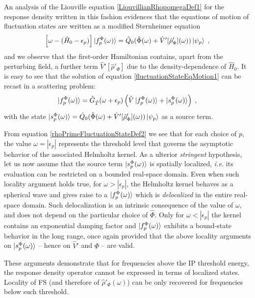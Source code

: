 \documentclass[reprint,aps,prb]{revtex4-1}
\newcommand{\eps}{\epsilon}
\newcommand{\be}{\begin{equation}}
\newcommand{\ee}{\end{equation}}
\newcommand{\lb}{\label}
\newcommand{\op}[1]{\hat {#1}}
\newcommand{\dm}{\op{\rho}}
\newcommand{\hnot}{\op{H}_0}
\newcommand{\GH}{\op G_{\op T}}
\begin{document}
An analysis of the Liouville equation \eqref{LiouvillianRhopomegaDef1} for the response density written in this fashion evidences that the equations of motion of fluctuation states  are
written as a modified Sternheimer equation~\cite{mahan1980,giustino2012,giustino2014}
\be\lb{fluctuationStateEqMotion1}
\left[\omega - (\hnot-\eps_p)\right]\ket{f_p^\Phi(\omega)} = \op Q_0(\op\Phi(\omega)+\op V'[\dm'_\Phi](\omega))\ket{\psi_p} \;,
\ee
and we observe that the first-order Hamiltonian contains,
apart from the perturbing field, a further term $\op V'[\dm'_\Phi]$ due to the density-dependence of $\hnot$.
It is easy to see that the solution of equation \eqref{fluctuationStateEqMotion1} can be recast in a scattering problem:
\be\lb{rhoPrimeFluctuationStateDef2}
\ket{f_p^\Phi(\omega)} = \GH(\omega+\epsilon_p)\left(\op V\ket{f_p^\Phi(\omega)} + \ket{s_p^\Phi(\omega)} \right)\;,
\ee
with the state
$
\ket{s_p^\Phi(\omega)} = \op Q_0(\op \Phi(\omega) +\op V'[\dm'_\Phi](\omega) )\ket{\psi_p}
$ as a source term.

From equation \eqref{rhoPrimeFluctuationStateDef2} we see that for each choice of $p$, the value $\omega = |\eps_p|$ represents the threshold level that governs the asymptotic behavior of the associated Helmholtz kernel.
As a ulterior \emph{stringent} hypothesis, let us now assume that the source term $\ket{s_p^\Phi(\omega)}$ is spatially localized, \textit{i.e.} its evaluation can be restricted on a bounded real-space domain.
Even when such locality argument holds true, for $\omega > |\eps_p|$,
the Helmholtz kernel behaves as a spherical wave and  gives raise to a $\ket{f^\Phi_p(\omega)}$ which is \emph{delocalized} in the entire real-space domain.
Such delocalization is an intrinsic consequence of the value of $\omega$, and does not depend on the particular choice of
$\op \Phi$.
Only for $\omega < |\eps_p|$ the kernel contains an exponential damping factor and $\ket{f^\Phi_p(\omega)}$ exhibits a bound-state behavior in the long range,
once again provided that the above locality arguments on $\ket{s_p^\Phi(\omega)}$ -- hence on $\op V'$ and $\Phi$ -- are valid.

These arguments demonstrate that for frequencies above the IP threshold energy, the response density operator cannot be expressed in terms of localized states. Locality of FS (and therefore of $\dm'_\Phi(\omega)$) can be only recovered for frequencies below such threshold.
\end{document}
